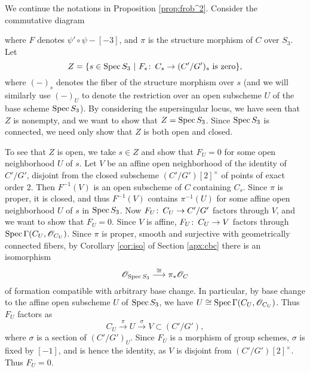 \documentclass{gtpart}
\theoremstyle{definition}
\theoremstyle{remark}
\def\co{\colon\thinspace}
\newcommand{\Spec}{{\rm Spec\thinspace}}
\newcommand{\G}{\Gamma}
\newcommand{\CO}{{\mathscr{O}}}
\begin{document}
We continue the notations in Proposition \ref{prop:frob^2}.  
Consider the commutative diagram 
\begin{center}
\end{center}
where $F$ denotes $\psi' \circ \psi - [-3]$, and $\pi$ is the structure morphism of $C$ over $S_3$.  Let 
\[
 Z = \{ s \in \Spec S_3~|~F_s \co C_s \to (C'/G')_s ~\text{is zero} \}, 
\]
where $(-)_s$ denotes the fiber of the structure morphism over $s$ 
(and we will similarly use $(-)_U$ to denote the restriction over an open subscheme $U$ of the base scheme $\Spec S_3$).  
By considering the supersingular locus, we have seen that $Z$ is nonempty, and we want to show that $Z = \Spec S_3$.  
Since $\Spec S_3$ is connected, we need only show that $Z$ is both open and closed.  

To see that $Z$ is open, we take $s \in Z$ and show that $F_U = 0$ for some open neighborhood $U$ of $s$.  
Let $V$ be an affine open neighborhood of the identity of $C'/G'$, disjoint from the closed subscheme $(C'/G')[2]^\times$ of points of exact order 2.  
Then $F^{-1}(V)$ is an open subscheme of $C$ containing $C_s$.  
Since $\pi$ is proper, it is closed, and thus $F^{-1}(V)$ contains $\pi^{-1}(U)$ for some affine open neighborhood $U$ of $s$ in $\Spec S_3$.  
Now $F_U \co C_U \to C'/G'$ factors through $V$, and we want to show that $F_U = 0$.  
Since $V$ is affine, $F_U \co C_U \to V$ factors through $\Spec \G(C_U, \CO_{C_U})$.  
Since $\pi$ is proper, smooth and surjective with geometrically connected fibers, by Corollary \ref{cor:iso} of Section \ref{apx:cbc} there is an isomorphism 
\[
 \CO_{\Spec S_3} \stackrel{\cong}{\longrightarrow} \pi_*\CO_C 
\]
of formation compatible with arbitrary base change.  
In particular, by base change to the affine open subscheme $U$ of $\Spec S_3$, we have $U \cong \Spec \G(C_U, \CO_{C_U})$.  
Thus $F_U$ factors as 
\[
 C_U \stackrel{\pi}{\longrightarrow} U \stackrel{\sigma}{\longrightarrow} V \subset (C'/G'), 
\]
where $\sigma$ is a section of $(C'/G')_U$.  
Since $F_U$ is a morphism of group schemes, $\sigma$ is fixed by $[-1]$, and is hence the identity, as $V$ is disjoint from $(C'/G')[2]^\times$.  
Thus $F_U = 0$.  
\end{document}
